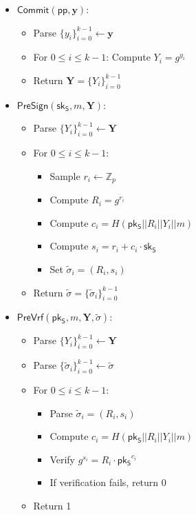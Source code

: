 \begin{itemize}
\item $\mathsf{Commit}(\mathsf{pp}, \mathbf{y})$:
   \begin{itemize}
       \item Parse $\{y_i\}_{i=0}^{k-1} \leftarrow \mathbf{y}$
       \item For $0\leq i\leq k-1$: Compute $Y_i = g^{y_i}$
       \item Return $\mathbf{Y} = \{Y_i\}_{i=0}^{k-1}$
   \end{itemize}

\item $\mathsf{PreSign}(\mathsf{sk_S}, m, \mathbf{Y})$:
   \begin{itemize}
       \item Parse $\{Y_i\}_{i=0}^{k-1} \leftarrow \mathbf{Y}$
       \item For $0\leq i\leq k-1$:
       \begin{itemize}
           \item Sample $r_i \leftarrow \mathbb{Z}_p$
           \item Compute $R_i = g^{r_i}$
           \item Compute $c_i = H(\mathsf{pk_S}||R_i || Y_i||m)$
           \item Compute $s_i = r_i + c_i \cdot \mathsf{sk_S}$
           \item Set $\widetilde{\sigma}_i = (R_i,s_i)$
       \end{itemize}
       \item Return $\widetilde{\sigma} = \{\widetilde{\sigma}_i\}_{i=0}^{k-1}$
   \end{itemize}
   
\item $\mathsf{PreVrf}(\mathsf{pk_S}, m, \mathbf{Y}, \widetilde{\sigma})$:
   \begin{itemize}
       \item Parse $\{Y_i\}_{i=0}^{k-1} \leftarrow \mathbf{Y}$
       \item Parse $\{\widetilde{\sigma}_i\}_{i=0}^{k-1} \leftarrow \widetilde{\sigma}$
       \item For $0\leq i\leq k-1$:
       \begin{itemize}
           \item Parse $\widetilde{\sigma}_i = (R_i,s_i)$
           \item Compute $c_i = H(\mathsf{pk_S}||R_i ||Y_i||m)$
           \item Verify $g^{s_i} = R_i \cdot \mathsf{pk_S}^{c_i}$
           \item If verification fails, return 0
       \end{itemize}
       \item Return 1
   \end{itemize}


\end{itemize}
